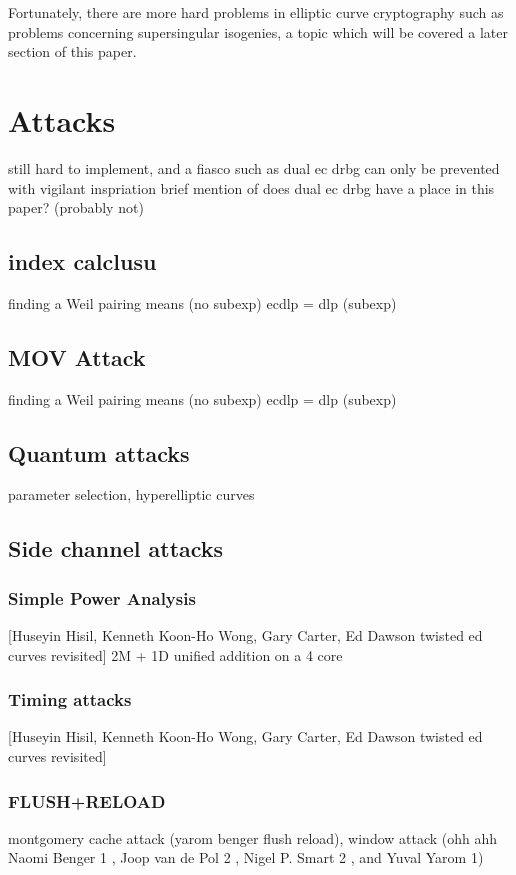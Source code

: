 \documentclass{article}
\begin{document}
Fortunately, there are more hard problems in elliptic curve cryptography such
as problems concerning supersingular isogenies, a topic which will be covered a
later section of this paper.

\section{Attacks}
still hard to implement, and a fiasco such as dual ec drbg can only be
prevented with vigilant inspriation
brief mention of does dual ec drbg have a place in this paper? (probably not)

\subsection{index calclusu}
finding a Weil pairing means (no subexp) ecdlp = dlp (subexp)

\subsection{MOV Attack}
finding a Weil pairing means (no subexp) ecdlp = dlp (subexp)

\subsection{Quantum attacks}
parameter selection, hyperelliptic curves

\subsection{Side channel attacks}
\subsubsection{Simple Power Analysis}
[Huseyin Hisil, Kenneth Koon-Ho Wong, Gary Carter, Ed Dawson twisted ed curves revisited]
2M + 1D unified addition on a 4 core

\subsubsection{Timing attacks}
[Huseyin Hisil, Kenneth Koon-Ho Wong, Gary Carter, Ed Dawson twisted ed curves revisited]

\subsubsection{FLUSH+RELOAD}
montgomery cache attack (yarom benger flush reload), 
window attack (ohh ahh Naomi Benger 1 , Joop van de Pol 2 , Nigel P. Smart 2 , and Yuval Yarom 1)
\end{document}
